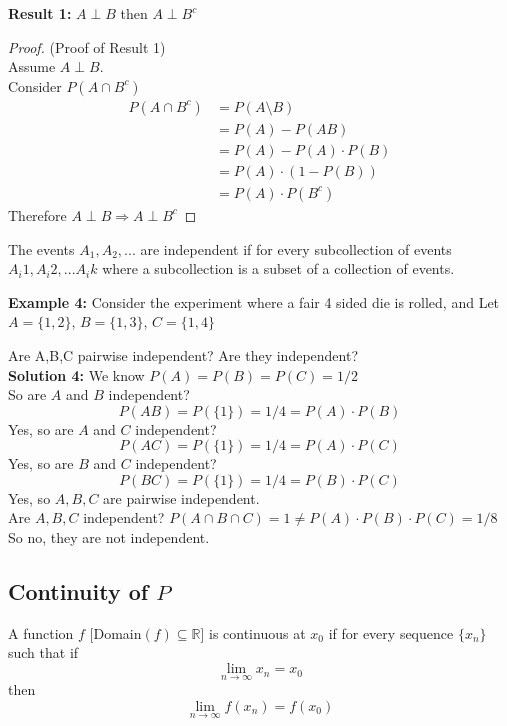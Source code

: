 \documentclass[12pt]{article}
\begin{document}
\textbf{Result 1:} $A \perp B$ then $A \perp B^c$
\begin{proof} (Proof of Result 1)\\
	Assume $A \perp B$.\\
	Consider $P(A \cap B^c)$
	\begin{align*}
		P(A \cap B^c) &= P(A \setminus B)\\
		&= P(A) - P(AB)\\
		&= P(A) - P(A) \cdot P(B)\\
		&= P(A) \cdot (1 - P(B))\\
		&= P(A) \cdot P(B^c)
	\end{align*}
	Therefore $A \perp B \Longrightarrow A \perp B^c$
\end{proof}

\begin{tcolorbox}[title=Definition: General Definition of Independent Events]
	The events $A_1, A_2, ...$ are independent if for every subcollection of events $A_i1, A_i2, ... A_ik$ where a subcollection is a subset of a collection of events.
\end{tcolorbox}

\textbf{Example 4:} Consider the experiment where a fair 4 sided die is rolled, and Let $A = \{ 1,2 \}$, $B = \{ 1,3 \}$, $C = \{ 1,4 \}$

Are A,B,C pairwise independent? Are they independent?
\\
\textbf{Solution 4:} We know $P(A) = P(B) = P(C) = 1/2$\\
So are $A$ and $B$ independent?
$$P(AB) = P(\{ 1 \}) = 1/4 = P(A)\cdot P(B)$$
Yes, so are $A$ and $C$ independent?
$$P(AC) = P(\{ 1 \}) = 1/4 = P(A)\cdot P(C)$$
Yes, so are $B$ and $C$ independent?
$$P(BC) = P(\{ 1 \}) = 1/4 = P(B)\cdot P(C)$$
Yes, so $A, B, C$ are pairwise independent.\\
Are $A,B,C$ independent?
$P(A\cap B \cap C) = 1 \neq P(A) \cdot P(B) \cdot P(C) = 1/8$
So no, they are not independent.

\subsection{Continuity of $P$}

\begin{tcolorbox}[title=Definition: Continuous]
	A function $f$ [Domain$(f) \subseteq \mathbb{R}$] is continuous at $x_0$ if for every sequence $\{x_n\}$ such that if $$\lim_{n\to\infty} x_n = x_0$$ then $$\lim_{n\to\infty} f(x_n) = f(x_0)$$
\end{tcolorbox}
\end{document}
